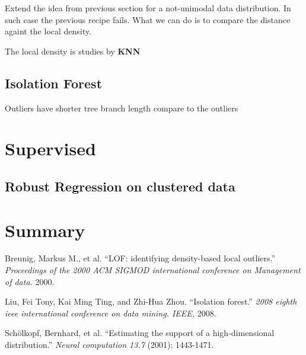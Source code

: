 \documentclass{article}
\begin{document}
Extend the idea from previous section for a not-unimodal data distribution. In such case the previous recipe fails. What we can do is to compare the distance againt the local density.

The local density is studies by {\bf KNN}

\subsection{Isolation Forest}

Outliers have shorter tree branch length compare to the outliers

\section{Supervised}

\subsection{Robust Regression on clustered data}


\section{Summary}


\begin{thebibliography}{10}

 Breunig, Markus M., et al. ``LOF: identifying density-based local outliers.'' {\em Proceedings of the 2000 ACM SIGMOD international conference on Management of data.} 2000.
  
 Liu, Fei Tony, Kai Ming Ting, and Zhi-Hua Zhou. ``Isolation forest.'' {\em 2008 eighth ieee international conference on data mining. IEEE,} 2008.

 Sch\"{o}lkopf, Bernhard, et al. ``Estimating the support of a high-dimensional distribution.'' {\em Neural computation 13.7} (2001): 1443-1471.

\end{thebibliography}
\end{document}
